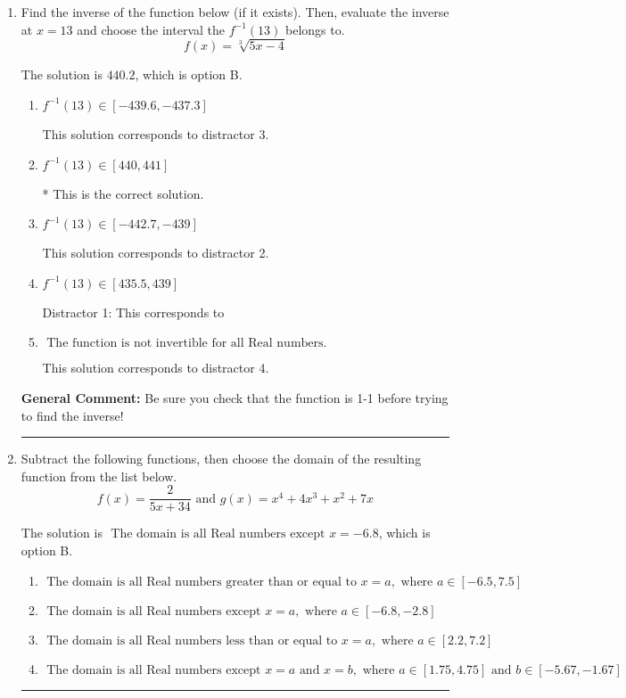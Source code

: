 \documentclass{extbook}[14pt]
\newcommand{\litem}[1]{\item #1

\rule{\textwidth}{0.4pt}}
\begin{document}
\begin{enumerate}\litem{
Find the inverse of the function below (if it exists). Then, evaluate the inverse at $x = 13$ and choose the interval the $f^{-1}(13)$ belongs to.
\[ f(x) = \sqrt[3]{5 x - 4} \]

The solution is \( 440.2 \), which is option B.\begin{enumerate}[label=\Alph*.]
\item \( f^{-1}(13) \in [-439.6, -437.3] \)

 This solution corresponds to distractor 3.
\item \( f^{-1}(13) \in [440, 441] \)

* This is the correct solution.
\item \( f^{-1}(13) \in [-442.7, -439] \)

 This solution corresponds to distractor 2.
\item \( f^{-1}(13) \in [435.5, 439] \)

 Distractor 1: This corresponds to 
\item \( \text{ The function is not invertible for all Real numbers. } \)

 This solution corresponds to distractor 4.
\end{enumerate}

\textbf{General Comment:} Be sure you check that the function is 1-1 before trying to find the inverse!
}
\litem{
Subtract the following functions, then choose the domain of the resulting function from the list below.
\[ f(x) = \frac{2}{5x+34} \text{ and } g(x) = x^{4} +4 x^{3} + x^{2} +7 x \]

The solution is \( \text{ The domain is all Real numbers except } x = -6.8 \), which is option B.\begin{enumerate}[label=\Alph*.]
\item \( \text{ The domain is all Real numbers greater than or equal to } x = a, \text{ where } a \in [-6.5, 7.5] \)


\item \( \text{ The domain is all Real numbers except } x = a, \text{ where } a \in [-6.8, -2.8] \)


\item \( \text{ The domain is all Real numbers less than or equal to } x = a, \text{ where } a \in [2.2, 7.2] \)


\item \( \text{ The domain is all Real numbers except } x = a \text{ and } x = b, \text{ where } a \in [1.75, 4.75] \text{ and } b \in [-5.67, -1.67] \)



\end{enumerate}}
\end{enumerate}
\end{document}

